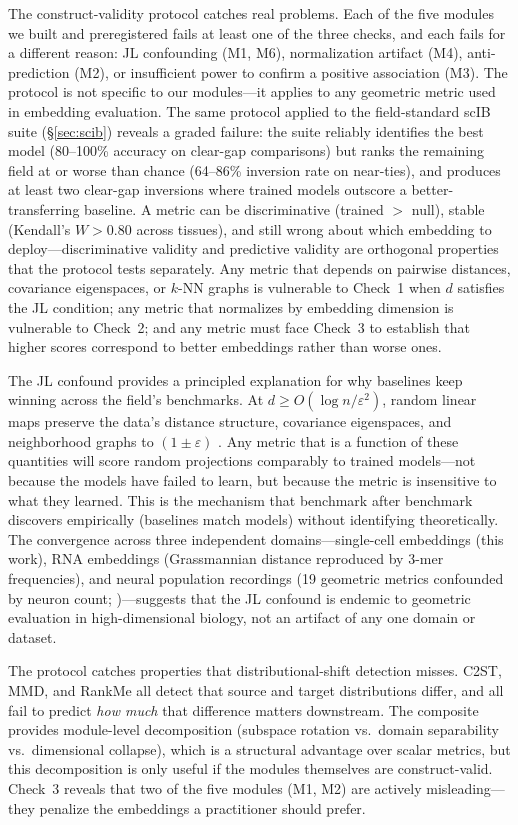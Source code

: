 \documentclass[9pt,lineno]{elife}
\begin{document}
The construct-validity protocol catches real problems. Each of the five modules we built and preregistered fails at least one of the three checks, and each fails for a different reason: JL confounding (M1, M6), normalization artifact (M4), anti-prediction (M2), or insufficient power to confirm a positive association (M3). The protocol is not specific to our modules---it applies to any geometric metric used in embedding evaluation. The same protocol applied to the field-standard scIB suite (\S\ref{sec:scib}) reveals a graded failure: the suite reliably identifies the best model (80--100\% accuracy on clear-gap comparisons) but ranks the remaining field at or worse than chance (64--86\% inversion rate on near-ties), and produces at least two clear-gap inversions where trained models outscore a better-transferring baseline. A metric can be discriminative (trained $>$ null), stable (Kendall's $W > 0.80$ across tissues), and still wrong about which embedding to deploy---discriminative validity and predictive validity are orthogonal properties that the protocol tests separately. Any metric that depends on pairwise distances, covariance eigenspaces, or $k$-NN graphs is vulnerable to Check~1 when $d$ satisfies the JL condition; any metric that normalizes by embedding dimension is vulnerable to Check~2; and any metric must face Check~3 to establish that higher scores correspond to better embeddings rather than worse ones.

The JL confound provides a principled explanation for why baselines keep winning across the field's benchmarks. At $d \geq O(\log n / \varepsilon^2)$, random linear maps preserve the data's distance structure, covariance eigenspaces, and neighborhood graphs to $(1 \pm \varepsilon)$ \citep{johnsonlindenstrauss1984}. Any metric that is a function of these quantities will score random projections comparably to trained models---not because the models have failed to learn, but because the metric is insensitive to what they learned. This is the mechanism that benchmark after benchmark discovers empirically (baselines match models) without identifying theoretically. The convergence across three independent domains---single-cell embeddings (this work), RNA embeddings (Grassmannian distance reproduced by 3-mer frequencies), and neural population recordings (19 geometric metrics confounded by neuron count; \citealp{tower2026bracket})---suggests that the JL confound is endemic to geometric evaluation in high-dimensional biology, not an artifact of any one domain or dataset.

The protocol catches properties that distributional-shift detection misses. C2ST, MMD, and RankMe all detect that source and target distributions differ, and all fail to predict \emph{how much} that difference matters downstream. The composite provides module-level decomposition (subspace rotation vs.\ domain separability vs.\ dimensional collapse), which is a structural advantage over scalar metrics, but this decomposition is only useful if the modules themselves are construct-valid. Check~3 reveals that two of the five modules (M1, M2) are actively misleading---they penalize the embeddings a practitioner should prefer.
\end{document}
